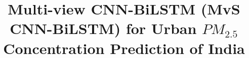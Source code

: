 \documentclass[a4paper,fleqn]{cas-dc}
\begin{document}
\let\WriteBookmarks\relax
\def\floatpagepagefraction{1}
\def\textpagefraction{.001}



\title [mode = title]{Multi-view CNN-BiLSTM (MvS CNN-BiLSTM) for Urban $PM_{2.5}$ Concentration Prediction of India}  

\end{document}
